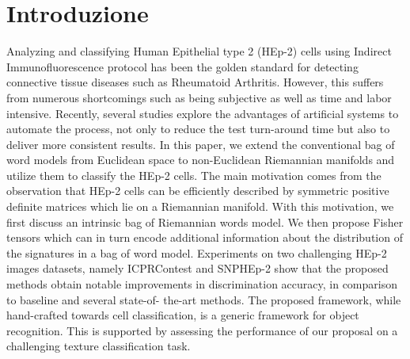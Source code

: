 \section{Introduzione}


Analyzing and classifying Human Epithelial type 2 (HEp-2) cells using Indirect Immunofluorescence protocol has been the golden standard for detecting connective tissue diseases such as Rheumatoid Arthritis. However, this suffers from numerous shortcomings such as being subjective as well as time and labor intensive. Recently, several studies explore the advantages of artificial systems to automate the process, not only to reduce the test turn-around time but also to deliver more consistent results. In this paper, we extend the conventional bag of word models from Euclidean space to non-Euclidean Riemannian manifolds and utilize them to classify the HEp-2 cells. The main motivation comes from the observation that HEp-2 cells can be efficiently described by symmetric positive definite matrices which lie on a Riemannian manifold. With this motivation, we first discuss an intrinsic bag of Riemannian words model. We then propose Fisher tensors which can in turn encode additional information about the distribution of the signatures in a bag of word model. Experiments on two challenging HEp-2 images datasets, namely ICPRContest and SNPHEp-2 show that the proposed methods obtain notable improvements in discrimination accuracy, in comparison to baseline and several state-of- the-art methods. The proposed framework, while hand-crafted towards cell classification, is a generic framework for object recognition. This is supported by assessing the performance of our proposal on a challenging texture classification task.